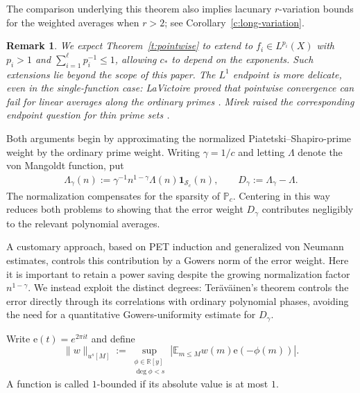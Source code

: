 \documentclass[12pt]{amsart}
\newcommand{\E}{\mathbb E}
\newcommand{\1}{\mathbf 1}
\newcommand{\e}{\mathrm e}
\newtheorem{remark}[theorem]{Remark}
\begin{document}
The comparison underlying this theorem also implies lacunary
$r$-variation bounds for the weighted averages when $r>2$;
see Corollary~\ref{c:long-variation}.


\begin{remark}
We expect Theorem~\ref{t:pointwise} to extend to
$f_i\in L^{p_i}(X)$ with $p_i>1$ and
$\sum_{i=1}^{\ell}p_i^{-1}\leq1$, allowing $c_*$ to depend on
the exponents. Such extensions lie beyond the scope of this paper.
The $L^1$ endpoint is more delicate, even in the single-function
case: LaVictoire proved that pointwise convergence can fail for
linear averages along the ordinary primes \cite{LaVictoireBad}.
Mirek raised the corresponding endpoint question for thin
prime sets \cite[discussion following Theorem~1.14]{MirekThinPrimes}.
\end{remark}






Both arguments begin by approximating the normalized
Piatetski--Shapiro-prime weight by the ordinary prime weight.
Writing $\gamma=1/c$ and letting $\Lambda$ denote the von Mangoldt
function, put
\begin{align}\label{e:weights}
    \Lambda_\gamma(n)
 :=\gamma^{-1}n^{1-\gamma}\Lambda(n)\1_{\mathcal S_c}(n),
 \qquad D_\gamma:=\Lambda_\gamma-\Lambda.
\end{align}
The normalization compensates for the sparsity of $\mathbb P_c$.
Centering in this way reduces both problems to showing that the
error weight $D_\gamma$ contributes negligibly to the relevant
polynomial averages.

A customary approach, based on PET induction and generalized von
Neumann estimates, controls this contribution by a Gowers norm of
the error weight. Here it is important to retain a power saving
despite the growing normalization factor $n^{1-\gamma}$. We instead
exploit the distinct degrees: Ter\"av\"ainen's theorem controls the
error directly through its correlations with ordinary polynomial
phases, avoiding the need for a quantitative Gowers-uniformity
estimate for $D_\gamma$.

Write $\e(t)=e^{2\pi it}$ and define
\begin{equation}\label{e:u-norm}
 \|w\|_{u^s[M]}
 :=\sup_{\substack{\phi\in\mathbb R[y]\\\deg\phi<s}}
 \left|\E_{m\leq M}w(m)\e(-\phi(m))\right|.
\end{equation}
A function is called $1$-bounded if its absolute value is at most $1$. 
\end{document}
